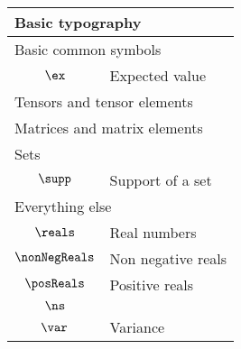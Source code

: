 \begin{longtable}{cl}
\multicolumn{2}{l}{Basic typography}\\ 
 \hline
\hline
\multicolumn{2}{l}{Basic common symbols}\\ 
 \hline
$\ex$ &  Expected value\\ 
 \multicolumn{2}{l}{Tensors and tensor elements}\\ 
 \hline
\multicolumn{2}{l}{Matrices and matrix elements}\\ 
 \hline
\multicolumn{2}{l}{Sets}\\ 
 \hline
$\supp$ &  Support of a set\\ 
 \multicolumn{2}{l}{Everything else}\\ 
 \hline
$\reals$ &  Real numbers\\ 
 $\nonNegReals$ &  Non negative reals\\ 
 $\posReals$ &  Positive reals\\ 
 $\ns$ & \\ 
 $\var$ &  Variance\\ 
 \end{longtable}
